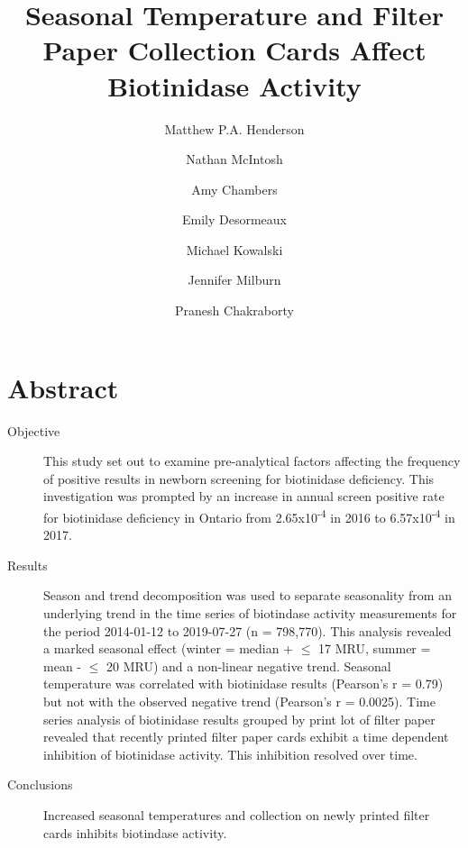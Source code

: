 \documentclass[review]{elsarticle}
\date{}
\title{}
\begin{document}
\makeatletter
\newcommand{\citeprocitem}[2]{\hyper@linkstart{cite}{citeproc_bib_item_#1}#2\hyper@linkend}
\makeatother



\begin{frontmatter}
\title{Seasonal Temperature and Filter Paper Collection Cards Affect Biotinidase Activity}
\author[NSO, UoO]{Matthew P.A. Henderson}
\author[NSO]{Nathan McIntosh}
\author[NSO]{Amy Chambers}
\author[NSO]{Emily Desormeaux}
\author[NSO]{Michael Kowalski}
\author[NSO]{Jennifer Milburn}
\author[NSO, UO]{Pranesh Chakraborty}
\address[NSO]{Newborn Screening Ontario, Children's Hospital of Eastern Ontario}
\address[UoO]{Department of Medicine, University of Ottawa} 
\end{frontmatter}

\section*{Abstract}
\label{sec:org10fc8ab}
\begin{description}
\item[{Objective}] This study set out to examine pre-analytical factors
affecting the frequency of positive results in newborn screening for
biotinidase deficiency. This investigation was prompted by an
increase in annual screen positive rate for biotinidase deficiency
in Ontario from 2.65x10\textsuperscript{-4} in 2016 to 6.57x10\textsuperscript{-4} in 2017.

\item[{Results}] Season and trend decomposition was used to separate
seasonality from an underlying trend in the time series of
biotindase activity measurements for the period 2014-01-12 to
2019-07-27 (n = 798,770). This analysis revealed a marked seasonal
effect (winter = median + \(\le\) 17 MRU, summer = mean - \(\le\) 20 MRU)
and a non-linear negative trend. Seasonal temperature was correlated
with biotinidase results (Pearson's r = 0.79) but not with the
observed negative trend (Pearson's r = 0.0025). Time series analysis
of biotinidase results grouped by print lot of filter paper revealed
that recently printed filter paper cards exhibit a time dependent
inhibition of biotinidase activity. This inhibition resolved over
time.

\item[{Conclusions}] Increased seasonal temperatures and collection on
newly printed filter cards inhibits biotindase activity.
\end{description}
\end{document}
